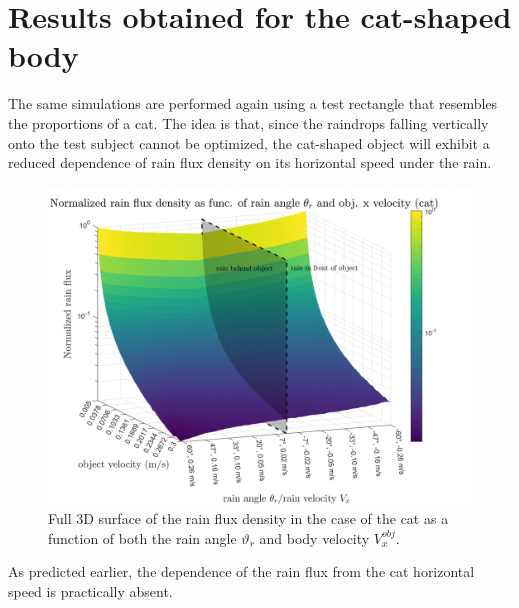 \documentclass[12pt]{report}
\begin{document}
        \section{Results obtained for the cat-shaped body}
            The same simulations are performed again using a test rectangle that resembles the proportions of a cat. The idea is that, since the raindrops falling vertically onto the test subject cannot be optimized, the cat-shaped object will exhibit a reduced dependence of rain flux density on its horizontal speed under the rain.
            \begin{figure}[H]
                \centering
                \includegraphics[width=1\textwidth]{images/cat/rain_flux_surf_3D_cat.pdf}
                \caption{Full 3D surface of the rain flux density in the case of the cat as a function of both the rain angle $\vartheta_r$ and body velocity $V^{obj}_x$.}
            \end{figure}
            \vspace{-30pt}
            As predicted earlier, the dependence of the rain flux from the cat horizontal speed is practically absent.
\end{document}
